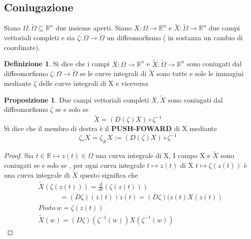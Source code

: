 \documentclass{article}
\theoremstyle{definition}
\newtheorem{definizione}{Definizione}[section]
\newtheorem{prop}{Proposizione}
\newcommand{\R}{\mathbb{R}}
\newcommand{\Rn}{\R^n}
\newcommand{\tom}{\widetilde{\Omega}}
\begin{document}
\subsection{Coniugazione}
Siano $\Omega , \widetilde{\Omega} \subseteq \Rn  $  due insieme aperti. Siano  $X : \Omega \rightarrow \Rn$ e  $\widetilde{X} : \widetilde{\Omega} \rightarrow \Rn$ due campi vettoriali completi e sia $\zeta: \Omega \to \tom$ un diffeomorfismo ( in sostanza un cambio di coordinate).
\begin{definizione}
Si dice che i campi $X : \Omega \rightarrow \Rn$ e  $\widetilde{X} : \widetilde{\Omega} \rightarrow \Rn$ sono coniugati dal diffeomorfismo $\zeta: \Omega \to \tom$ se le curve integrali di $\widetilde{X}$ sono tutte e sole le immagini mediante $\zeta$ delle curve integrali di X e viceversa 
\begin{center}
	\Large
{}
\end{center}
\end{definizione}
\begin{prop}
Due campi vettoriali completi $X,\widetilde{X}$ sono coniugati dal diffeomorfismo $\zeta$ se e solo se 
$$\widetilde{X}=(D(\zeta)X)\circ \zeta^{-1}$$
Si dice che il membro di destra è il \textbf{PUSH-FOWARD} di X mediante $$\zeta_{*} X=\zeta_{\#}X:=(D(\zeta)X)\circ \zeta^{-1}$$
\end{prop}
\begin{proof}
	Sia $t \in \R \mapsto z(t) \in \Omega$ una curva integrale di X, I campo X e $\widetilde{X}$ sono coniugati se e solo se , per ogni curva integrale $t \mapsto z(t)$ di X $t \mapsto \zeta(z(t))$ è una curva integrale di $\widetilde{X}$  questo significa che 
	\begin{align*}
		&\widetilde{X}(\zeta(z(t)))=\frac{d}{dt} \left(\zeta(z(t))\right) \\
		&  \ \ \ \ \ \ \ \ \ \ \ \ \ \ =(D\zeta) (z(t))\dot{z}(t) = (D\zeta )(z(t)X(z(t)) \\ 
		&Posto \ w=\zeta(z(t)) \\ 
		&\widetilde{X}(w)=(D\zeta)(\zeta^{-1}(w))X(\zeta^{-1}(w))
	\end{align*}
\end{proof}
\end{document}
